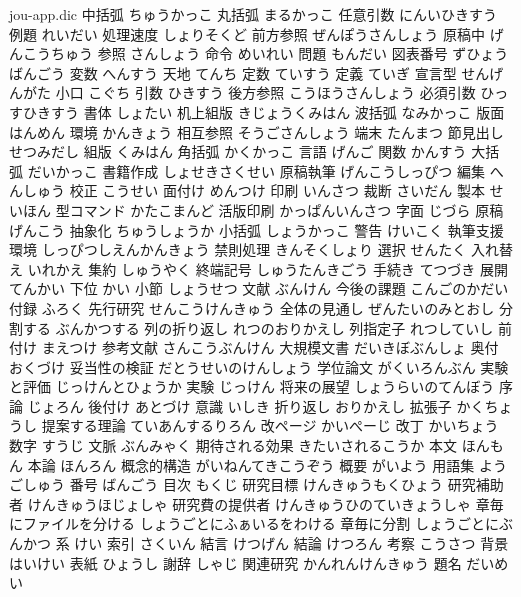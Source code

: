 


\begin{filecontents*}{jou-app.dic}
中括弧		ちゅうかっこ
丸括弧		まるかっこ
任意引数	にんいひきすう
例題		れいだい
処理速度	しょりそくど
前方参照	ぜんぽうさんしょう
原稿中		げんこうちゅう
参照		さんしょう
命令		めいれい
問題		もんだい
図表番号	ずひょうばんごう
変数		へんすう
天地		てんち
定数		ていすう
定義		ていぎ
宣言型		せんげんがた
小口		こぐち
引数		ひきすう
後方参照	こうほうさんしょう
必須引数	ひっすひきすう
書体		しょたい
机上組版	きじょうくみはん
波括弧		なみかっこ
版面		はんめん
環境		かんきょう
相互参照	そうごさんしょう
端末		たんまつ
節見出し	せつみだし
組版		くみはん
角括弧		かくかっこ
言語		げんご
関数		かんすう
大括弧		だいかっこ
書籍作成	しょせきさくせい
原稿執筆	げんこうしっぴつ
編集		へんしゅう
校正		こうせい
面付け		めんつけ
印刷		いんさつ
裁断		さいだん
製本		せいほん
型コマンド	かたこまんど
活版印刷	かっぱんいんさつ
字面		じづら
原稿		げんこう
抽象化		ちゅうしょうか
小括弧		しょうかっこ
警告		けいこく
執筆支援環境	しっぴつしえんかんきょう
禁則処理	きんそくしょり
選択		せんたく
入れ替え	いれかえ
集約		しゅうやく
終端記号	しゅうたんきごう
手続き		てつづき
展開		てんかい
下位		かい
小節		しょうせつ
文献		ぶんけん
今後の課題	こんごのかだい
付録 		ふろく
先行研究 	せんこうけんきゅう
全体の見通し 	ぜんたいのみとおし
分割する 	ぶんかつする
列の折り返し 	れつのおりかえし
列指定子 	れつしていし
前付け		まえつけ
参考文献 	さんこうぶんけん
大規模文書 	だいきぼぶんしょ
奥付 		おくづけ
妥当性の検証 	だとうせいのけんしょう
学位論文 	がくいろんぶん
実験と評価 	じっけんとひょうか
実験		じっけん
将来の展望 	しょうらいのてんぼう
序論 		じょろん
後付け 		あとづけ
意識 		いしき
折り返し 	おりかえし
拡張子 		かくちょうし
提案する理論 	ていあんするりろん
改ページ 	かいぺーじ
改丁 		かいちょう
数字 		すうじ
文脈 		ぶんみゃく
期待される効果 きたいされるこうか
本文 	       ほんもん
本論 	       ほんろん
概念的構造     がいねんてきこうぞう
概要 	       がいよう
用語集 	       ようごしゅう
番号 	       ばんごう
目次 	       もくじ
研究目標       けんきゅうもくひょう
研究補助者     けんきゅうほじょしゃ
研究費の提供者 けんきゅうひのていきょうしゃ
章毎にファイルを分ける	しょうごとにふぁいるをわける
章毎に分割 	しょうごとにぶんかつ
系		けい
索引 		さくいん
結言 		けつげん
結論 		けつろん
考察 		こうさつ
背景 		はいけい
表紙 		ひょうし
謝辞 		しゃじ
関連研究 	かんれんけんきゅう
題名 		だいめい
\end{filecontents*}

